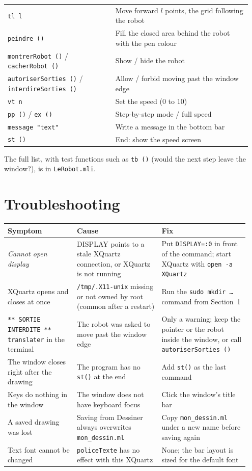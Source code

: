 \documentclass[11pt,a4paper]{article}
\newcommand{\kbd}[1]{\texttt{#1}}
\begin{document}
\begin{longtable}{@{}p{0.42\linewidth} p{0.53\linewidth}@{}}
\kbd{tl l} & Move forward $l$ points, the grid following the robot \\
\kbd{peindre ()} & Fill the closed area behind the robot with the pen colour \\
\kbd{montrerRobot ()} / \kbd{cacherRobot ()} & Show / hide the robot \\
\kbd{autoriserSorties ()} / \kbd{interdireSorties ()} & Allow / forbid moving past the window edge \\
\kbd{vt n} & Set the speed (0 to 10) \\
\kbd{pp ()} / \kbd{ex ()} & Step-by-step mode / full speed \\
\kbd{message "text"} & Write a message in the bottom bar \\
\kbd{st ()} & End: show the speed screen \\
\end{longtable}

The full list, with test functions such as \kbd{tb ()} (would the next step
leave the window?), is in \kbd{LeRobot.mli}.

\section{Troubleshooting}

\begin{longtable}{@{}p{0.27\linewidth} p{0.33\linewidth} p{0.34\linewidth}@{}}
\toprule
\textbf{Symptom} & \textbf{Cause} & \textbf{Fix} \\
\midrule
\endhead
\bottomrule
\endfoot
\emph{Cannot open display} & DISPLAY points to a stale XQuartz connection, or XQuartz is not running & Put \kbd{DISPLAY=:0} in front of the command; start XQuartz with \kbd{open -a XQuartz} \\
\addlinespace
XQuartz opens and closes at once & \kbd{/tmp/.X11-unix} missing or not owned by root (common after a restart) & Run the \kbd{sudo mkdir \dots} command from Section~1 \\
\addlinespace
\kbd{** SORTIE INTERDITE ** translater} in the terminal & The robot was asked to move past the window edge & Only a warning; keep the pointer or the robot inside the window, or call \kbd{autoriserSorties ()} \\
\addlinespace
The window closes right after the drawing & The program has no \kbd{st()} at the end & Add \kbd{st()} as the last command \\
\addlinespace
Keys do nothing in the window & The window does not have keyboard focus & Click the window's title bar \\
\addlinespace
A saved drawing was lost & Saving from Dessiner always overwrites \kbd{mon\_dessin.ml} & Copy \kbd{mon\_dessin.ml} under a new name before saving again \\
\addlinespace
Text font cannot be changed & \kbd{policeTexte} has no effect with this XQuartz & None; the bar layout is sized for the default font \\
\end{longtable}
\end{document}
